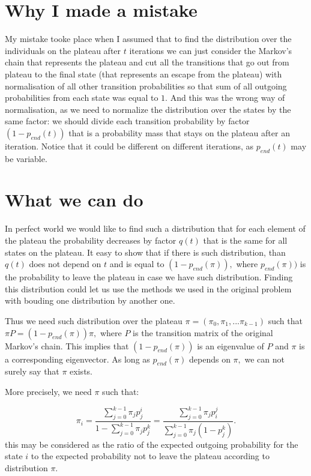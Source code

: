 \documentclass{article}
\begin{document}
\section{Why I made a mistake}

My mistake tooke place when I assumed that to find the distribution over the individuals on the plateau after $t$ iterations we can just consider the Markov's chain that represents the plateau and cut all the transitions that go out from plateau to the final state (that represents an escape from the plateau) with normalisation of all other transition probabilities so that sum of all outgoing probabilities from each state was equal to $1.$ And this was the wrong way of normalisation, as we need to normalize the distribution over the states by the same factor: we should divide each transition probability by factor $(1 - p_{end}(t))$ that is a probability mass that stays on the plateau after an iteration. Notice that it could be different on different iterations, as $p_{end}(t)$ may be variable.

\section{What we can do}

In perfect world we would like to find such a distribution that for each element of the plateau the probability decreases by factor $q(t)$ that is the same for all states on the plateau. It easy to show that if there is such distribution, than $q(t)$ does not depend on $t$ and is equal to $(1 - p_{end}(\pi)),$ where $p_{end}(\pi))$ is the probability to leave the plateau in case we have such distribution. Finding this distribution could let us use the methods we used in the original problem with bouding one distribution by another one.

Thus we need such distribution over the plateau $\pi = (\pi_0, \pi_1, ... \pi_{k - 1})$ such that $\pi P = (1 - p_{end}(\pi)) \pi,$ where $P$ is the transition matrix of the original Markov's chain. This implies that $(1 - p_{end}(\pi))$ is an eigenvalue of $P$ and $\pi$ is a corresponding eigenvector. As long as $p_{end}(\pi)$ depends on $\pi,$ we can not surely say that $\pi$ exists.

More precisely, we need $\pi$ such that:

$$\pi_i = \frac{\sum\limits_{j = 0}^{k - 1} \pi_j p_j^i}{1 - \sum\limits_{j = 0}^{k - 1} \pi_j p_j^k} = \frac{\sum\limits_{j = 0}^{k - 1} \pi_j p_i^j}{\sum\limits_{j = 0}^{k - 1} \pi_j (1 - p_j^k)}.$$
this may be considered as the ratio of the expected outgoing probability for the state $i$ to the expected probability not to leave the plateau according to distribution $\pi.$
\end{document}
